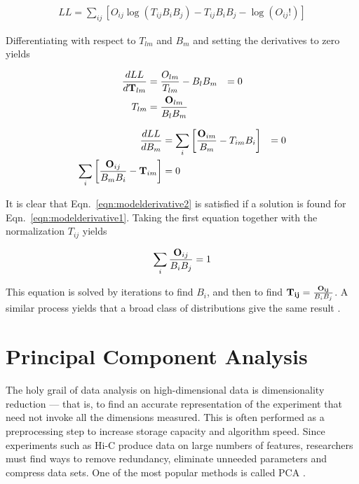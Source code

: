 \begin{align}
  \label{eqn:llmodel}
  LL = \sum_{ij}\left[O_{ij}\log{(T_{ij}B_{i}B_{j})} - T_{ij}B_{i}B_{j} - \log{(O_{ij}!)}\right]
\end{align}

Differentiating with respect to $T_{lm}$ and $B_m$ and setting the derivatives to zero yields

\begin{align}
  \label{eqn:modelderivative1}
  \frac{dLL}{d\mathbf{T}_{lm}} &= \frac{O_{lm}}{T_{lm}} - B_{l}B_{m} &= 0 \\
  T_{lm} &= \frac{\mathbf{O}_{lm}}{B_{l}B_{m}}
\end{align}

\begin{align}
  \label{eqn:modelderivative2}
  \frac{dLL}{dB_{m}} &= \sum_i\left[\frac{\mathbf{O}_{im}}{B_m} - T_{im}B_i\right] &= 0 \\
  \sum_i\left[\frac{\mathbf{O}_{ij}}{B_{m}B_{i}} - \mathbf{T}_{im}\right] &= 0
\end{align}

It is clear that Eqn.~\eqref{eqn:modelderivative2} is satisfied if a solution is found for Eqn.~\eqref{eqn:modelderivative1}.  Taking the first equation together  with the
normalization $T_{ij}$ yields

\begin{align}
  \label{eqn:result}
  \sum_i \frac{\mathbf{O}_{ij}}{B_{i}B_{j}} = 1
\end{align}

This equation is solved by iterations to find $B_i$, and then to find $\mathbf{T_{ij}} = \frac{\mathbf{O_{ij}}}{B_{i}B_j}$.  A similar process yields that a broad class of
distributions give the same result \citep{imakaev2012}.

\section*{Principal Component Analysis}

The holy grail of data analysis on high-dimensional data is dimensionality reduction --- that is, to find an accurate representation of
the experiment that need not invoke all the dimensions measured.  This is often performed as a preprocessing step to increase storage capacity
and algorithm speed.  Since experiments such as Hi-C produce data on large numbers of features, researchers must find ways to remove redundancy,
eliminate unneeded parameters and compress data sets.  One of the most popular methods is called \gls{PCA} \citep{law1987}.

